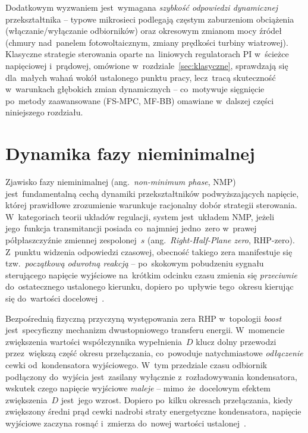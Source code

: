 Dodatkowym wyzwaniem jest~wymagana \emph{szybkość odpowiedzi dynamicznej} przekształtnika -- typowe mikrosieci podlegają częstym zaburzeniom obciążenia (włączanie/wyłączanie odbiorników) oraz okresowym zmianom mocy źródeł (chmury nad~panelem fotowoltaicznym, zmiany prędkości turbiny wiatrowej). Klasyczne strategie sterowania oparte na~liniowych regulatorach PI w~ścieżce napięciowej i~prądowej, omówione w~rozdziale~\ref{sec:klasyczne}, sprawdzają się dla~małych wahań wokół ustalonego punktu pracy, lecz~tracą skuteczność w~warunkach głębokich zmian dynamicznych -- co~motywuje sięgnięcie po~metody zaawansowane (FS-MPC, MF-BB) omawiane w~dalszej części niniejszego rozdziału.

\section{Dynamika fazy nieminimalnej}
\label{sec:nmp}

Zjawisko fazy nieminimalnej (ang.~\emph{non-minimum phase}, NMP) jest~fundamentalną cechą dynamiki przekształtników podwyższających napięcie, której prawidłowe zrozumienie warunkuje racjonalny dobór strategii sterowania. W~kategoriach teorii układów regulacji, system jest~układem NMP, jeżeli jego~funkcja transmitancji posiada co~najmniej jedno~zero w~prawej półpłaszczyźnie zmiennej zespolonej~$s$ (ang.~\emph{Right-Half-Plane zero}, RHP-zero). Z~punktu widzenia odpowiedzi czasowej, obecność takiego zera manifestuje się tzw.~\emph{początkową odwrotną reakcją} -- po~skokowym pobudzeniu sygnału sterującego napięcie wyjściowe na~krótkim odcinku czasu zmienia się \emph{przeciwnie} do~ostatecznego ustalonego kierunku, dopiero po~upływie tego~okresu kierując się do~wartości docelowej~\cite{tatari2024mfbb}.

Bezpośrednią fizyczną przyczyną występowania zera RHP w~topologii \emph{boost} jest~specyficzny mechanizm dwustopniowego transferu energii. W~momencie zwiększenia wartości współczynnika wypełnienia~$D$ klucz dolny przewodzi przez~większą część okresu przełączania, co~powoduje natychmiastowe \emph{odłączenie} cewki od~kondensatora wyjściowego. W~tym przedziale czasu odbiornik podłączony do~wyjścia jest~zasilany wyłącznie z~rozładowywania kondensatora, wskutek czego napięcie wyjściowe \emph{maleje} -- mimo~że~docelowym efektem zwiększenia~$D$ jest~jego wzrost. Dopiero po~kilku okresach przełączania, kiedy zwiększony średni prąd cewki nadrobi straty energetyczne kondensatora, napięcie wyjściowe zaczyna rosnąć i~zmierza do~nowej wartości ustalonej~\cite{erickson2020}.

